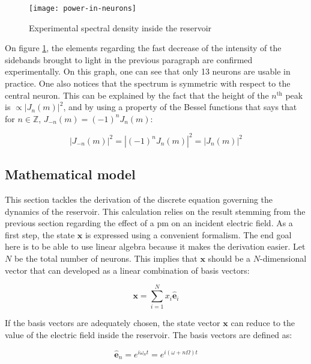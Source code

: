 \begin{figure}[h]
	\centering
	\texttt{[image: power-in-neurons]}
	\caption{Experimental spectral density inside the reservoir \cite{AkroutAkram2016Pprc}}
	\label{power-in-neurons}
\end{figure}

On figure \ref{power-in-neurons}, the elements regarding the fast decrease of the intensity of the sidebands brought to light in the previous paragraph are confirmed experimentally. On this graph, one can see that only 13 neurons are usable in practice. One also notices that the spectrum is symmetric with respect to the central neuron. This can be explained by the fact that the height of the $n^{\text{th}}$ peak is $\propto |J_n(m)|^2$, and by using a property of the Bessel functions that says that for $n \in \mathbb{Z}$, $J_{-n}(m)=(-1)^n J_n(m)$:

\begin{equation}
	|J_{-n}(m)|^2 = |(-1)^n J_n(m)|^2 = |J_n(m)|^2
\end{equation}


\subsection{Mathematical model}

\label{subsec-reservoir-model}

This section tackles the derivation of the discrete equation governing the dynamics of the reservoir. This calculation relies on the result stemming from the previous section regarding the effect of a \gls{pm} on an incident electric field. As a first step, the state $\mathbf{x}$ is expressed using a convenient formalism. The end goal here is to be able to use linear algebra because it makes the derivation easier. Let $N$ be the total number of neurons. This implies that $\mathbf{x}$ should be a $N$-dimensional vector that can developed as a linear combination of basis vectors:

\begin{equation}
	\mathbf{x} = \sum_{i=1}^{N} x_i \hat{\mathbf{e}}_i
\end{equation}

If the basis vectors are adequately chosen, the state vector $\mathbf{x}$ can reduce to the value of the electric field inside the reservoir. The basis vectors are defined as:

\begin{equation}
	\hat{\mathbf{e}}_n = e^{i\omega_nt} = e^{i(\omega+n\Omega)t}
\end{equation}

